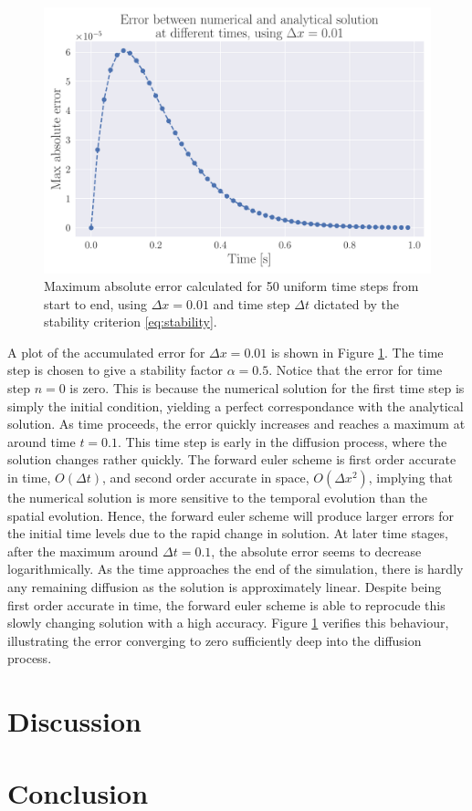 \documentclass[12pt]{extarticle}
\begin{document}
\begin{figure}[h]
	\centering
	\includegraphics[scale=0.5]{../output/plots/error_FE}
	\caption{Maximum absolute error calculated for 50 uniform time steps from start to end, using $\Delta x=0.01$ and time step $\Delta t$ dictated by the stability criterion \ref{eq:stability}.}
	\label{fig:error_dx001_n50}
\end{figure}

\par A plot of the accumulated error for $\Delta x=0.01$ is shown in Figure \ref{fig:error_dx001_n50}. The time step is chosen to give a stability factor $\alpha=0.5$. Notice that the error for time step $n=0$ is zero. This is because the numerical solution for the first time step is simply the initial condition, yielding a perfect correspondance with the analytical solution. As time proceeds, the error quickly increases and reaches a maximum at around time $t=0.1$. This time step is early in the diffusion process, where the solution changes rather quickly. The forward euler scheme is first order accurate in time, $O(\Delta t)$, and second order accurate in space, $O(\Delta x^2)$, implying that the numerical solution is more sensitive to the temporal evolution than the spatial evolution. Hence, the forward euler scheme will produce larger errors for the initial time levels due to the rapid change in solution. At later time stages, after the maximum around $\Delta t=0.1$, the absolute error seems to decrease logarithmically. As the time approaches the end of the simulation, there is hardly any remaining diffusion as the solution is approximately linear. Despite being first order accurate in time, the forward euler scheme is able to reprocude this slowly changing solution with a high accuracy. Figure \ref{fig:error_dx001_n50} verifies this behaviour, illustrating the error converging to zero sufficiently deep into the diffusion process.


\section{Discussion}
\section{Conclusion}



\end{document}
